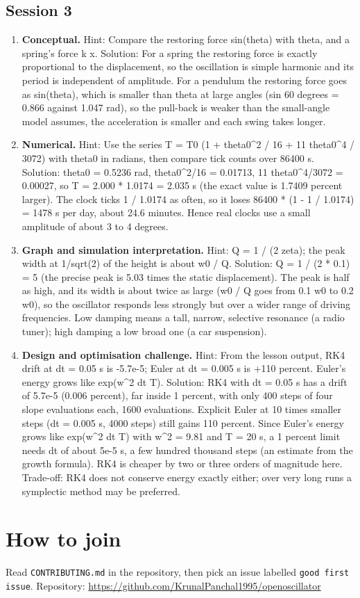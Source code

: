 \documentclass[11pt,a4paper]{article}
\begin{document}
\subsection*{Session 3}
\begin{enumerate}[nosep]
\item \textbf{Conceptual.} Hint: Compare the restoring force sin(theta) with theta, and a spring's force k x. Solution: For a spring the restoring force is exactly proportional to the displacement, so the oscillation is simple harmonic and its period is independent of amplitude. For a pendulum the restoring force goes as sin(theta), which is smaller than theta at large angles (sin 60 degrees = 0.866 against 1.047 rad), so the pull-back is weaker than the small-angle model assumes, the acceleration is smaller and each swing takes longer.
\item \textbf{Numerical.} Hint: Use the series T = T0 (1 + theta0\textasciicircum{}2 / 16 + 11 theta0\textasciicircum{}4 / 3072) with theta0 in radians, then compare tick counts over 86400 s. Solution: theta0 = 0.5236 rad, theta0\textasciicircum{}2/16 = 0.01713, 11 theta0\textasciicircum{}4/3072 = 0.00027, so T = 2.000 * 1.0174 = 2.035 s (the exact value is 1.7409 percent larger). The clock ticks 1 / 1.0174 as often, so it loses 86400 * (1 - 1 / 1.0174) = 1478 s per day, about 24.6 minutes. Hence real clocks use a small amplitude of about 3 to 4 degrees.
\item \textbf{Graph and simulation interpretation.} Hint: Q = 1 / (2 zeta); the peak width at 1/sqrt(2) of the height is about w0 / Q. Solution: Q = 1 / (2 * 0.1) = 5 (the precise peak is 5.03 times the static displacement). The peak is half as high, and its width is about twice as large (w0 / Q goes from 0.1 w0 to 0.2 w0), so the oscillator responds less strongly but over a wider range of driving frequencies. Low damping means a tall, narrow, selective resonance (a radio tuner); high damping a low broad one (a car suspension).
\item \textbf{Design and optimisation challenge.} Hint: From the lesson output, RK4 drift at dt = 0.05 s is -5.7e-5; Euler at dt = 0.005 s is +110 percent. Euler's energy grows like exp(w\textasciicircum{}2 dt T). Solution: RK4 with dt = 0.05 s has a drift of 5.7e-5 (0.006 percent), far inside 1 percent, with only 400 steps of four slope evaluations each, 1600 evaluations. Explicit Euler at 10 times smaller steps (dt = 0.005 s, 4000 steps) still gains 110 percent. Since Euler's energy grows like exp(w\textasciicircum{}2 dt T) with w\textasciicircum{}2 = 9.81 and T = 20 s, a 1 percent limit needs dt of about 5e-5 s, a few hundred thousand steps (an estimate from the growth formula). RK4 is cheaper by two or three orders of magnitude here. Trade-off: RK4 does not conserve energy exactly either; over very long runs a symplectic method may be preferred.
\end{enumerate}

\section{How to join}
Read \texttt{CONTRIBUTING.md} in the repository, then pick an issue labelled \texttt{good first issue}. Repository: \url{https://github.com/KrunalPanchal1995/openoscillator}
\end{document}
